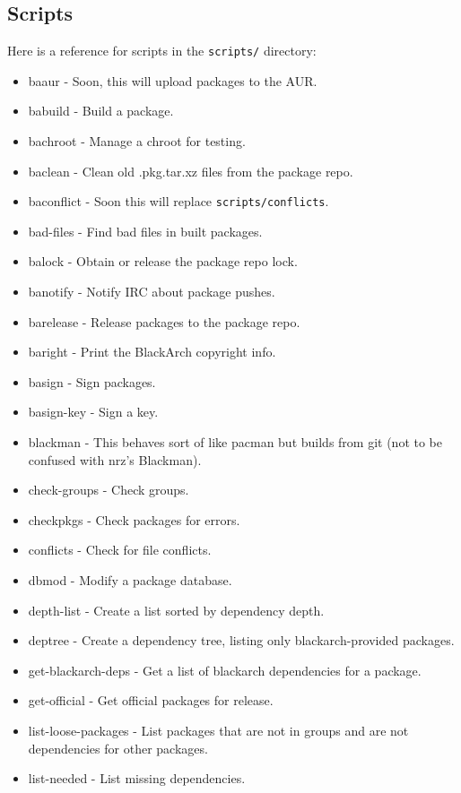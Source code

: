 \documentclass[a4paper, oneside, 11pt]{book}
\begin{document}
\subsection{Scripts}

Here is a reference for scripts in the \verb|scripts/| directory:

\begin{itemize}
	\item baaur - Soon, this will upload packages to the AUR.
	\item babuild - Build a package.
	\item bachroot - Manage a chroot for testing.
	\item baclean - Clean old .pkg.tar.xz files from the package repo.
	\item baconflict - Soon this will replace \verb|scripts/conflicts|.
	\item bad-files - Find bad files in built packages.
	\item balock - Obtain or release the package repo lock.
	\item banotify - Notify IRC about package pushes.
	\item barelease - Release packages to the package repo.
	\item baright - Print the BlackArch copyright info.
	\item basign - Sign packages.
	\item basign-key - Sign a key.
	\item blackman - This behaves sort of like pacman but builds from git (not to be confused with nrz's Blackman).
	\item check-groups - Check groups.
	\item checkpkgs - Check packages for errors.
	\item conflicts - Check for file conflicts.
	\item dbmod - Modify a package database.
	\item depth-list - Create a list sorted by dependency depth.
	\item deptree - Create a dependency tree, listing only blackarch-provided packages.
	\item get-blackarch-deps - Get a list of blackarch dependencies for a package.
	\item get-official - Get official packages for release.
	\item list-loose-packages - List packages that are not in groups and are not dependencies for other packages.
	\item list-needed - List missing dependencies.

\end{itemize}
\end{document}
